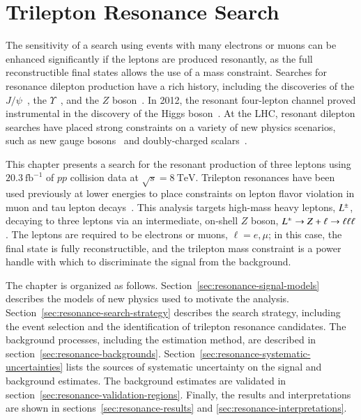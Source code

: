 \chapter{Trilepton Resonance Search}\label{ch:trilepton-resonance-search}
The sensitivity of a search using events with many electrons or muons can be enhanced significantly if the leptons are produced resonantly, as the full reconstructible final states allows the use of a mass constraint. Searches for resonance dilepton production have a rich history, including the discoveries of the $J/\psi$~\cite{jpsi1,jpsi2}, the $\Upsilon$~\cite{upsilon}, and the $Z$ boson~\cite{zua1}. In 2012, the resonant four-lepton channel proved instrumental in the discovery of the Higgs boson~\cite{ATLAS-higgs, CMS-higgs}. At the LHC, resonant dilepton searches have placed strong constraints on a variety of new physics scenarios, such as new gauge bosons~\cite{CMS_dilepton,zprime_8TeV} and doubly-charged scalars~\cite{doubly-charged-higgs}. 

This chapter presents a search for the resonant production of three leptons using $20.3~\mbox{fb}^{-1}$ of $pp$ collision data at $\sqrt{s}=8~\mbox{TeV}$. Trilepton resonances have been used previously at lower energies to place constraints on lepton flavor violation in muon and tau lepton decays~\cite{lll-flavor-decay-papers}. This analysis targets high-mass heavy leptons, $L^{\pm}$, decaying to three leptons via an intermediate, on-shell $Z$ boson, $L^{\pm} \rightarrow Z+\ell \rightarrow \ell\ell\ell$. The leptons are required to be electrons or muons, $\ell=e,\mu$; in this case, the final state is fully reconstructible, and the trilepton mass constraint is a power handle with which to discriminate the signal from the background. 

The chapter is organized as follows. Section~\ref{sec:resonance-signal-models} describes the models of new physics used to motivate the analysis. Section~\ref{sec:resonance-search-strategy} describes the search strategy, including the event selection and the identification of trilepton resonance candidates. The background processes, including the estimation method, are described in section~\ref{sec:resonance-backgrounds}. Section~\ref{sec:resonance-systematic-uncertainties} lists the sources of systematic uncertainty on the signal and background estimates. The background estimates are validated in section~\ref{sec:resonance-validation-regions}. Finally, the results and interpretations are shown in sections~\ref{sec:resonance-results} and \ref{sec:resonance-interpretations}. 

